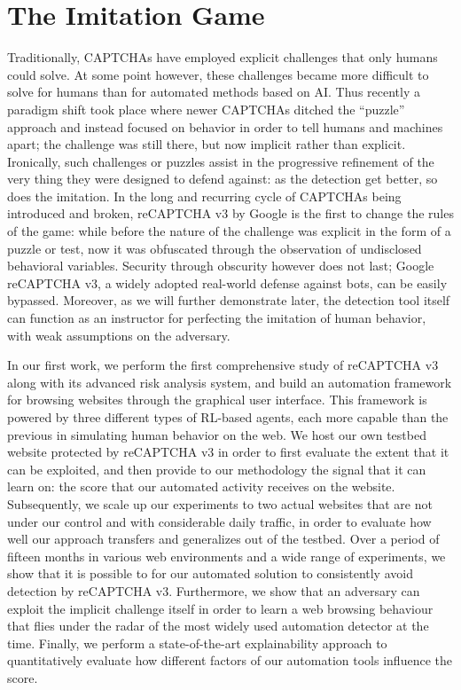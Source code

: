 \section{The Imitation Game}

Traditionally, CAPTCHAs have employed explicit challenges that only humans could solve.
At some point however, these challenges became more difficult to solve for humans than for automated methods based on \gls{AI}.
Thus recently a paradigm shift took place where newer CAPTCHAs ditched the ``puzzle'' approach and instead focused on behavior in order to tell humans and machines apart; the challenge was still there, but now implicit rather than explicit.
Ironically, such challenges or puzzles assist in the progressive refinement of the very thing they were designed to defend against: as the detection get better, so does the imitation.
In the long and recurring cycle of CAPTCHAs being introduced and broken, reCAPTCHA v3 by Google is the first to change the rules of the game: while before the nature of the challenge was explicit in the form of a puzzle or test, now it was obfuscated through the observation of undisclosed behavioral variables.
Security through obscurity however does not last; Google reCAPTCHA v3, a widely adopted real-world defense against bots, can be easily bypassed.
Moreover, as we will further demonstrate later, the detection tool itself can function as an instructor for perfecting the imitation of human behavior, with weak assumptions on the adversary.

In our first work, we perform the first comprehensive study of reCAPTCHA v3 along with its advanced risk analysis system, and build an automation framework for browsing websites through the graphical user interface.
This framework is powered by three different types of RL-based agents, each more capable than the previous in simulating human behavior on the web.
We host our own testbed website protected by reCAPTCHA v3 in order to first evaluate the extent that it can be exploited, and then provide to our methodology the signal that it can learn on: the score that our automated activity receives on the website.
Subsequently, we scale up our experiments to two actual websites that are not under our control and with considerable daily traffic, in order to evaluate how well our approach transfers and generalizes out of the testbed.
Over a period of fifteen months in various web environments and a wide range of experiments, we show that it is possible to for our automated solution to consistently avoid detection by reCAPTCHA v3.
Furthermore, we show that an adversary can exploit the implicit challenge itself in order to learn a web browsing behaviour that flies under the radar of the most widely used automation detector at the time.
Finally, we perform a state-of-the-art explainability approach to quantitatively evaluate how different factors of our automation tools influence the score.

